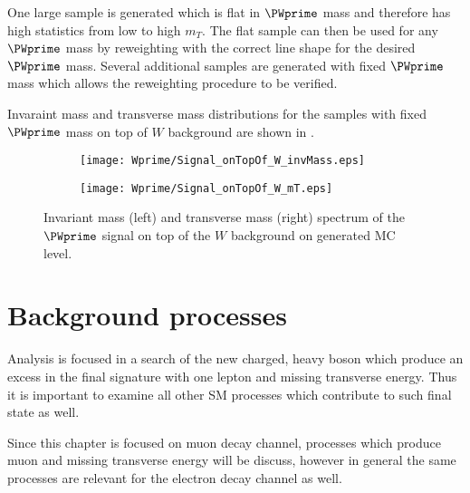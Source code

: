 One large sample is generated which is flat in $\PWprime$ mass and therefore has high 
statistics from low to high $m_T$.  The flat sample can then be used for any 
$\PWprime$ mass by reweighting with the correct line shape for the desired $\PWprime$ mass.
Several additional samples are generated with fixed $\PWprime$ mass which
allows the reweighting procedure to be verified.

Invaraint mass and transverse mass distributions for the samples with fixed $\PWprime$ mass on top of $W$ background are shown in .


\begin{figure}
\begin{subfigure}{.5\textwidth}
  \centering
  \texttt{[image: Wprime/Signal\_onTopOf\_W\_invMass.eps]}
\end{subfigure}%
\begin{subfigure}{.5\textwidth}
  \centering
  \texttt{[image: Wprime/Signal\_onTopOf\_W\_mT.eps]}
\end{subfigure}
\caption{Invariant mass (left) and transverse mass (right) spectrum of the $\PWprime$ signal 
on top of the $W$ background on generated MC level.}
  \label{fig:signal_with_W}
\end{figure}


\section{Background processes}
\label{sec:wprimeBackgrounds}

Analysis is focused in a search of the new charged, heavy boson which produce 
an excess in the final signature with one lepton and missing transverse energy.
Thus it is important to examine all other SM processes which contribute 
to such final state as well.


Since this chapter is focused on muon decay channel, processes which produce muon and
missing transverse energy will be discuss, however in general the same processes are 
relevant for the electron decay channel as well.

